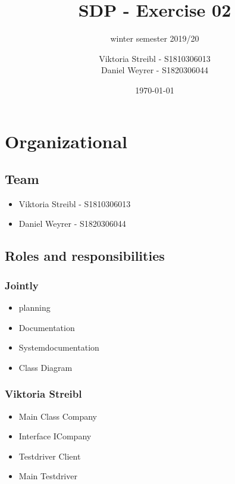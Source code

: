 

\graphicspath{{./}}



\title{SDP - Exercise 02} %
\subtitle{winter semester 2019/20} %
\author{
Viktoria Streibl - S1810306013\\
  Daniel Weyrer - S1820306044
} %
\date{\today} %

\maketitle %

\newpage
\tableofcontents %
\newpage


\section{Organizational}
\subsection{Team}
\begin{itemize}
	\item Viktoria 	Streibl 		- 	S1810306013
	\item Daniel 	Weyrer		-	S1820306044
\end{itemize}

\subsection{Roles and responsibilities}

\subsubsection{Jointly}
\begin{itemize}
	\item planning
	\item Documentation
	\item Systemdocumentation
	\item Class Diagram
\end{itemize}

\subsubsection{Viktoria Streibl}
\begin{itemize}
	\item Main Class Company
	\item Interface ICompany
	\item Testdriver Client
	\item Main Testdriver
	
\end{itemize}

